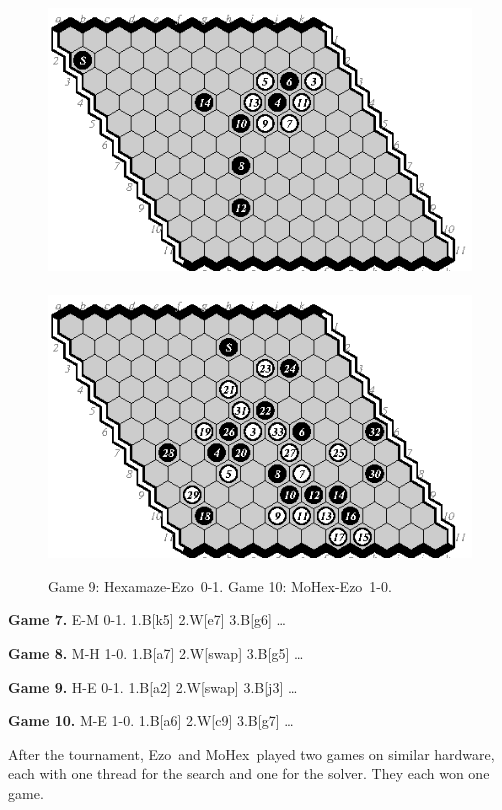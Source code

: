 \documentclass{icga}
\def\Eo{\mbox{\sc Ezo}}
\def\Hz{\mbox{\sc Hexamaze}}
\def\Mx{\mbox{\sc MoHex}}
\begin{document}
\begin{figure}[hbp]
\includegraphics[scale=1.3]{games/pix/09-he-0-1.eps}\hspace*{-1cm}\
\includegraphics[scale=1.3]{games/pix/10-me-1-0.eps}
\caption{Game 9: \Hz-\Eo\ 0-1. Game 10: \Mx-\Eo\ 1-0.}
\end{figure}

{\bf Game 7.}
{\sc E-M 0-1.}
1.B[k5] 2.W[e7] 3.B[g6] \ldots ~ ~ 

{\bf Game 8.}
{\sc M-H 1-0.}
1.B[a7] 2.W[swap] 3.B[g5] \ldots ~ ~ 

{\bf Game 9.}
{\sc H-E 0-1.}
1.B[a2] 2.W[swap] 3.B[j3] \ldots ~ ~ 

{\bf Game 10.}
{\sc M-E 1-0.}
1.B[a6] 2.W[c9] 3.B[g7] \ldots ~ ~ 

After the tournament, \Eo\ and \Mx\ played two games on similar
hardware, each with one thread for the search and one for the solver.
They each won one game.
\end{document}
